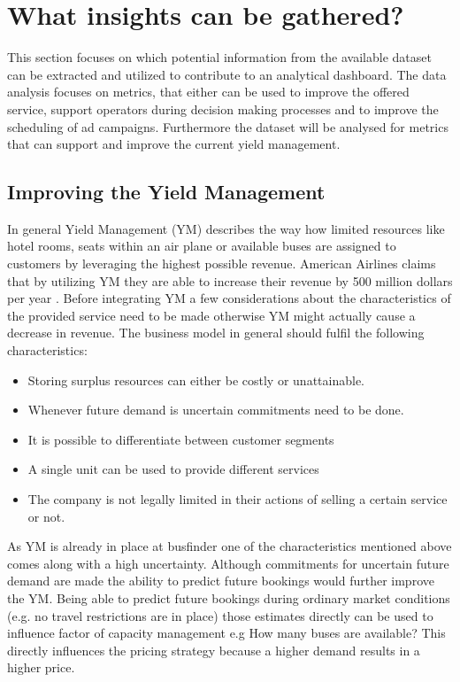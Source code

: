 %
%
% 
% 
% 


\chapter{What insights can be gathered?}
\label{chap:insights}
This section focuses on which potential information from the available dataset can be extracted and utilized to contribute to an analytical dashboard. The data analysis focuses on metrics, that either can be used to improve the offered service, support operators during decision making processes and to improve the scheduling of ad campaigns. Furthermore the dataset will be analysed for metrics that can support and improve the current yield management. 


\section{Improving the Yield Management}
In general Yield Management (YM) describes the way how limited resources like hotel rooms, seats within an air plane or available buses are assigned to customers by leveraging the highest possible revenue. American Airlines claims that by utilizing YM they are able to increase their revenue by 500 million dollars per year \cite{ym_practice}. Before integrating YM a few considerations about the characteristics of the provided service need to be made otherwise YM might actually cause a decrease in revenue. The business model in general should fulfil the following characteristics:\cite{ym_practice}
\begin{itemize}
  \item Storing surplus resources can either be costly or unattainable. 
  \item Whenever future demand is uncertain commitments need to be done.
  \item It is possible to differentiate between customer segments
  \item A single unit can be used to provide different services 
  \item The company is not legally limited in their actions of selling a certain service or not.
\end{itemize}
As YM is already in place at busfinder one of the characteristics mentioned above comes along with a high uncertainty. Although commitments for uncertain future demand are made the ability to predict future bookings would further improve the YM. Being able to predict future bookings during ordinary market conditions (e.g. no travel restrictions are in place) those estimates directly can be used to influence factor of capacity management e.g How many buses are available? This directly influences the pricing strategy because a higher demand results in a higher price.

